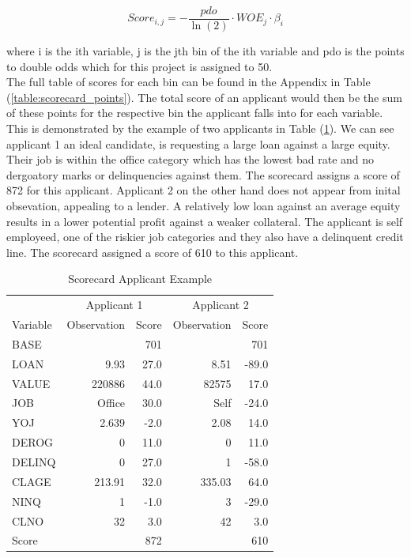 \begin{equation}\label{eq:scorecard}
Score_{i,j} = -\dfrac{pdo}{\ln(2)} \cdot WOE_{j} \cdot \beta_{i}
\end{equation}

where i is the ith variable, j is the jth bin of the ith variable and pdo is the points to double odds which for this project is assigned to 50. \\

The full table of scores for each bin can be found in the Appendix in Table (\ref{table:scorecard_points}). The total score of an applicant would then be the sum of these points for the respective bin the applicant falls into for each variable. This is demonstrated by the example of two applicants in Table (\ref{table:app_example}). We can see applicant 1 an ideal candidate, is requesting a large loan against a large equity. Their job is within the office category which has the lowest bad rate and no dergoatory marks or delinquencies against them. The scorecard assigns a score of 872 for this applicant. Applicant 2 on the other hand does not appear from inital obsevation, appealing to a lender. A relatively low loan against an average equity results in a lower potential profit against a weaker collateral. The applicant is self employeed, one of the riskier job categories and they also have a delinquent credit line. The scorecard assigned a score of 610 to this applicant. \\ 

\begin{table}[H]
\begin{center}
\begin{tabular}{lrrrr}
\toprule
& \multicolumn{2}{c}{Applicant 1} & \multicolumn{2}{c}{Applicant 2} \\
Variable & Observation & Score & Observation & Score \\
\midrule
BASE & & 701 & & 701 \\ 
LOAN & 9.93 & 27.0 & 8.51 & -89.0 \\
VALUE & 220886 & 44.0 & 82575 & 17.0 \\
JOB & Office & 30.0 & Self & -24.0 \\
YOJ & 2.639 & -2.0 & 2.08 & 14.0 \\
DEROG & 0 & 11.0 & 0 & 11.0 \\
DELINQ & 0 & 27.0 & 1 & -58.0 \\
CLAGE & 213.91 & 32.0 & 335.03 & 64.0\\
NINQ & 1 & -1.0 & 3 & -29.0 \\
CLNO & 32 & 3.0 & 42 & 3.0 \\
\midrule
Score &  & 872 &  & 610
\end{tabular}
\end{center}
\caption{Scorecard Applicant Example \label{table:app_example}}
\end{table}

